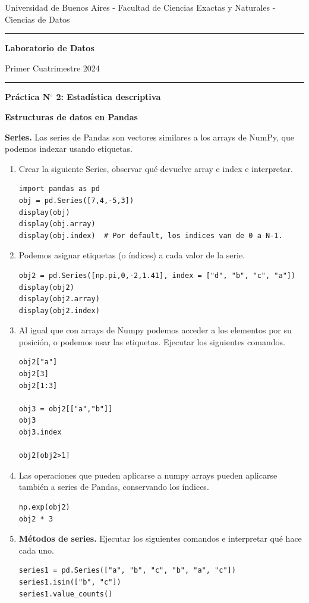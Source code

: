 \documentclass[a4paper,11pt]{article}
\theoremstyle{definition}
\begin{document}
\centerline{{\small Universidad de Buenos Aires - Facultad de Ciencias Exactas y Naturales - Ciencias de Datos}}

\vskip 0.2cm

\hrule

\vskip 0.2cm

 \centerline{{\bf\Large{\sc Laboratorio de Datos}}}

 \vskip 0.2cm

 \centerline{\ttfamily Primer Cuatrimestre 2024}

\vskip 0.2cm

 \hrule

 \bigskip
 \centerline{\bf Práctica N$^\circ$ 2: Estad\'istica descriptiva}
 \bigskip


\textbf{\large Estructuras de datos en Pandas}

\vspace{0.2cm}

\textbf{Series.} Las series de Pandas son vectores similares a los arrays de NumPy, que podemos indexar usando etiquetas.

\begin{enumerate}
\item Crear la siguiente Series, observar qué devuelve array e index e interpretar.

\begin{lstlisting}
import pandas as pd
obj = pd.Series([7,4,-5,3])
display(obj)
display(obj.array)
display(obj.index)  # Por default, los indices van de 0 a N-1.
\end{lstlisting}

\item Podemos asignar etiquetas (o \'indices) a cada valor de la serie.
\begin{lstlisting}
obj2 = pd.Series([np.pi,0,-2,1.41], index = ["d", "b", "c", "a"])
display(obj2)
display(obj2.array)
display(obj2.index)
\end{lstlisting}

\item Al igual que con arrays de Numpy podemos acceder a los elementos por su posici\'on, o podemos usar las etiquetas. Ejecutar los siguientes comandos.
\begin{lstlisting}
obj2["a"]
obj2[3]
obj2[1:3]

obj3 = obj2[["a","b"]]
obj3
obj3.index

obj2[obj2>1]
\end{lstlisting}

\item Las operaciones que pueden aplicarse a numpy arrays pueden aplicarse tambi\'en a series de Pandas, conservando los \'indices.
\begin{lstlisting}
np.exp(obj2)
obj2 * 3
\end{lstlisting}

\item \textbf{M\'etodos de series.} Ejecutar los siguientes comandos e interpretar qu\'e hace cada uno.
\begin{lstlisting}
series1 = pd.Series(["a", "b", "c", "b", "a", "c"])
series1.isin(["b", "c"])
series1.value_counts()
\end{lstlisting}

\end{enumerate}
\end{document}
